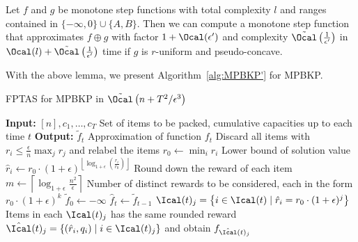 \begin{lemma}\label{lem:02}
	Let $f$ and $g$ be monotone step functions with total complexity $l$ and ranges contained in $\{-\infty,0\}\cup\{A,B\}$. Then we can compute a monotone step function that approximates $f\oplus g$ with factor $1+\Ocal(\epsilon')$ and complexity $\tilde{\Ocal}\left(\frac{1}{\epsilon'}\right)$ in $\Ocal(l) + \tilde{\Ocal}\left(\frac{1}{\epsilon'}\right)$ time if $g$ is $r$-uniform and pseudo-concave.
\end{lemma}
With the above lemma, we present Algorithm~\ref{alg:MPBKP'} for MPBKP. 

\begin{algorithm}[ht]
	\footnotesize
	\caption{FPTAS for MPBKP in $\tilde{\Ocal}\left(n+T^2/\epsilon^3\right)$}
	\label{alg:MPBKP'}
	\begin{algorithmic}[1]
		\Statex \textbf{Input:} $[n], c_1,\ldots, c_T$  \Comment Set of items to be packed, cumulative capacities up to each time $t$
		\Statex \textbf{Output:} $\tilde{f}_t$ \Comment Approximation of function $f_t$
		\State Discard all items with $r_i\le \frac{\epsilon}{n}\max_jr_j$ and relabel the items 
		\State $r_0\gets \min_ir_i$ \Comment Lower bound of solution value
		\State $\hat{r}_i\gets r_0\cdot (1+\epsilon)^{\left\lfloor\log_{1+\epsilon}\left(\frac{r_i}{r_0}\right)\right\rfloor}$
		\Comment Round down the reward of each item
		\State $m\gets \left\lceil\log_{1+\epsilon}\frac{n^2}{\epsilon}\right\rceil$ \Comment Number of distinct rewards to be considered, each in the form $r_0\cdot(1+\epsilon)^k$
		\State $\tilde{f}_0\gets -\infty$
		\State $\hat{f}_t\gets \tilde{f}_{t-1}$
		\State $\Ical(t)_j = \left\{i\in \Ical(t)\mid \hat{r}_i = r_0\cdot (1+\epsilon)^j\right\}$
		\Comment Items in each $\Ical(t)_j$ has the same rounded reward
		\State $\hat{\Ical}(t)_j = \left\{(\hat{r}_i,q_i)\mid i\in \Ical(t)_j\right\}$ and obtain $f_{\hat{\Ical}(t)_j}$

\end{algorithmic}
\end{algorithm}
